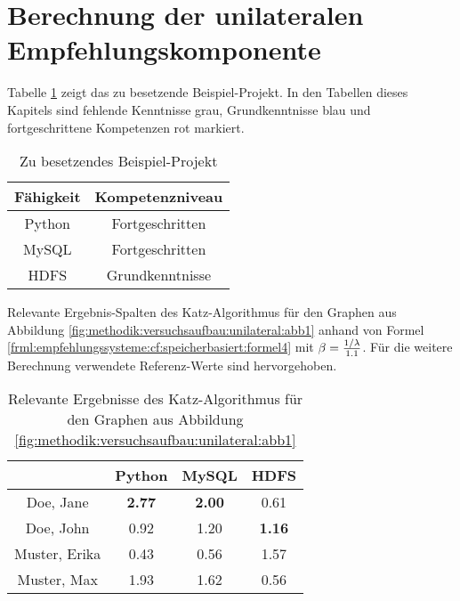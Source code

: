 \section{Berechnung der unilateralen Empfehlungskomponente}
\label{ch:nebenrechnungen:unilateral}
Tabelle \ref{tbl:berechnungDerKatzZentralitaetPseudoMitarbeiter:tbl1} zeigt das zu besetzende Beispiel-Projekt. In den Tabellen dieses Kapitels sind fehlende Kenntnisse grau, Grundkenntnisse blau und fortgeschrittene Kompetenzen rot markiert.
\begin{table}[h]
	\centering
	\begin{tabular}{c|c}
		Fähigkeit & Kompetenzniveau \\
		\hline
		Python  & \cellcolor{usercolor}Fortgeschritten\\
		MySQL   & \cellcolor{usercolor}Fortgeschritten\\
		HDFS    & \cellcolor{itemcolor}Grundkenntnisse
	\end{tabular}
	\caption{Zu besetzendes Beispiel-Projekt}
	\label{tbl:berechnungDerKatzZentralitaetPseudoMitarbeiter:tbl1}
\end{table}

Relevante Ergebnis-Spalten des Katz-Algorithmus für den Graphen aus Abbildung \ref{fig:methodik:versuchsaufbau:unilateral:abb1} anhand von Formel \ref{frml:empfehlungssysteme:cf:speicherbasiert:formel4} mit $\beta = \frac{1/\lambda}{1.1}$. Für die weitere Berechnung verwendete Referenz-Werte sind hervorgehoben.

\begin{table}[h]
	\centering
	\begin{tabular}{c|c|c|c}
		& Python & MySQL & HDFS\\ 
		\hline
		Doe, Jane     & \cellcolor{usercolor}\textbf{2.77} & \cellcolor{itemcolor}\textbf{2.00} & \cellcolor{exxetagray}0.61\\
		Doe, John     & \cellcolor{exxetagray}0.92 & \cellcolor{itemcolor}1.20 & \cellcolor{itemcolor}\textbf{1.16}\\
		Muster, Erika & \cellcolor{exxetagray}0.43 & \cellcolor{exxetagray}0.56 & \cellcolor{usercolor}1.57\\
		Muster, Max   & \cellcolor{itemcolor}1.93 & \cellcolor{itemcolor}1.62 & \cellcolor{exxetagray}0.56
	\end{tabular}
	\caption{Relevante Ergebnisse des Katz-Algorithmus für den Graphen aus Abbildung \ref{fig:methodik:versuchsaufbau:unilateral:abb1}}
	\label{tbl:berechnungDerKatzZentralitaetPseudoMitarbeiter:tbl2}
\end{table}

